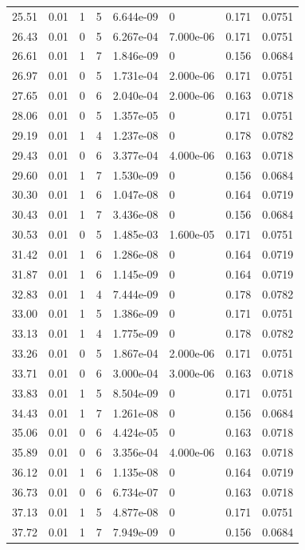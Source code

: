 \documentclass[preview]{standalone}
\begin{document}
{{{\begin{tabular}{L{1.2cm}C{1.2cm} C{0.3cm}C{0.5cm} C{1.4cm}C{1.4cm} C{1.4cm}C{1.4cm}}
  25.51  &  0.01  & 1     &  5 &  6.644e-09  & 0  & 0.171 &  0.0751   \\ 
  26.43  &  0.01  & 0     &  5 &  6.267e-04  & 7.000e-06  & 0.171 &  0.0751   \\ 
  26.61  &  0.01  & 1     &  7 &  1.846e-09  & 0  & 0.156 &  0.0684   \\ 
  26.97  &  0.01  & 0     &  5 &  1.731e-04  & 2.000e-06  & 0.171 &  0.0751   \\ 
  27.65  &  0.01  & 0     &  6 &  2.040e-04  & 2.000e-06  & 0.163 &  0.0718   \\ 
  28.06  &  0.01  & 0     &  5 &  1.357e-05  & 0  & 0.171 &  0.0751   \\ 
  29.19  &  0.01  & 1     &  4 &  1.237e-08  & 0  & 0.178 &  0.0782   \\ 
  29.43  &  0.01  & 0     &  6 &  3.377e-04  & 4.000e-06  & 0.163 &  0.0718   \\ 
  29.60  &  0.01  & 1     &  7 &  1.530e-09  & 0  & 0.156 &  0.0684   \\ 
  30.30  &  0.01  & 1     &  6 &  1.047e-08  & 0  & 0.164 &  0.0719   \\ 
  30.43  &  0.01  & 1     &  7 &  3.436e-08  & 0  & 0.156 &  0.0684   \\ 
  30.53  &  0.01  & 0     &  5 &  1.485e-03  & 1.600e-05  & 0.171 &  0.0751   \\ 
  31.42  &  0.01  & 1     &  6 &  1.286e-08  & 0  & 0.164 &  0.0719   \\ 
  31.87  &  0.01  & 1     &  6 &  1.145e-09  & 0  & 0.164 &  0.0719   \\ 
  32.83  &  0.01  & 1     &  4 &  7.444e-09  & 0  & 0.178 &  0.0782   \\ 
  33.00  &  0.01  & 1     &  5 &  1.386e-09  & 0  & 0.171 &  0.0751   \\ 
  33.13  &  0.01  & 1     &  4 &  1.775e-09  & 0  & 0.178 &  0.0782   \\ 
  33.26  &  0.01  & 0     &  5 &  1.867e-04  & 2.000e-06  & 0.171 &  0.0751   \\ 
  33.71  &  0.01  & 0     &  6 &  3.000e-04  & 3.000e-06  & 0.163 &  0.0718   \\ 
  33.83  &  0.01  & 1     &  5 &  8.504e-09  & 0  & 0.171 &  0.0751   \\ 
  34.43  &  0.01  & 1     &  7 &  1.261e-08  & 0  & 0.156 &  0.0684   \\ 
  35.06  &  0.01  & 0     &  6 &  4.424e-05  & 0  & 0.163 &  0.0718   \\ 
  35.89  &  0.01  & 0     &  6 &  3.356e-04  & 4.000e-06  & 0.163 &  0.0718   \\ 
  36.12  &  0.01  & 1     &  6 &  1.135e-08  & 0  & 0.164 &  0.0719   \\ 
  36.73  &  0.01  & 0     &  6 &  6.734e-07  & 0  & 0.163 &  0.0718   \\ 
  37.13  &  0.01  & 1     &  5 &  4.877e-08  & 0  & 0.171 &  0.0751   \\ 
  37.72  &  0.01  & 1     &  7 &  7.949e-09  & 0  & 0.156 &  0.0684   \\ 
\hline 
\end{tabular} 

}}}
\end{document}
